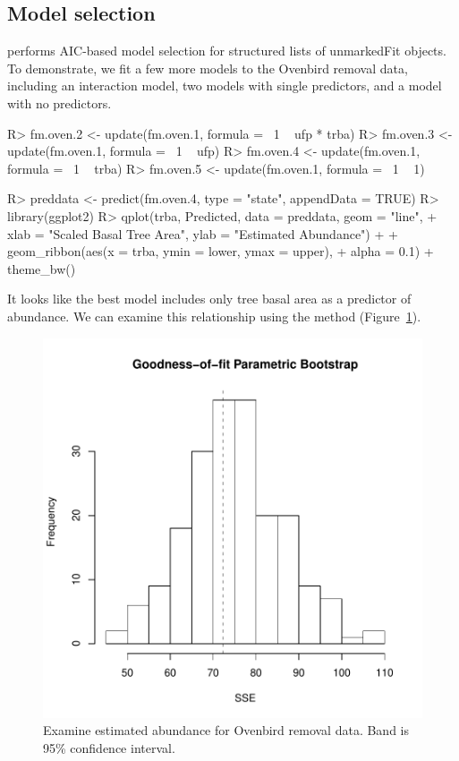 \documentclass[article,shortnames]{jss}
\begin{document}
{\subsection{Model selection}

 performs AIC-based model selection for structured lists of
unmarkedFit objects.  To demonstrate, we fit a few more models to the Ovenbird
removal data, including an interaction model, two models with
single predictors, and a model with no predictors.

\begin{Schunk}
\begin{Sinput}
R> fm.oven.2 <- update(fm.oven.1, formula = ~1 ~ ufp * trba)
R> fm.oven.3 <- update(fm.oven.1, formula = ~1 ~ ufp)
R> fm.oven.4 <- update(fm.oven.1, formula = ~1 ~ trba)
R> fm.oven.5 <- update(fm.oven.1, formula = ~1 ~ 1)
\end{Sinput}
\end{Schunk}


\begin{Schunk}
\begin{Sinput}
R> preddata <- predict(fm.oven.4, type = "state", appendData = TRUE)
R> library(ggplot2)
R> qplot(trba, Predicted, data = preddata, geom = "line", 
+     xlab = "Scaled Basal Tree Area", ylab = "Estimated Abundance") + 
+     geom_ribbon(aes(x = trba, ymin = lower, ymax = upper), 
+         alpha = 0.1) + theme_bw()
\end{Sinput}
\end{Schunk}




It looks like the best model includes only tree basal area as a
predictor of abundance.  We can examine this relationship using
the  method (Figure~\ref{fig:pred}).


\begin{figure}[th!]
  \centering
\includegraphics{unmarked-034}
\caption{Examine estimated abundance for Ovenbird removal data.  Band
  is 95\% confidence interval.}
\label{fig:pred}
\end{figure}


}
\end{document}

